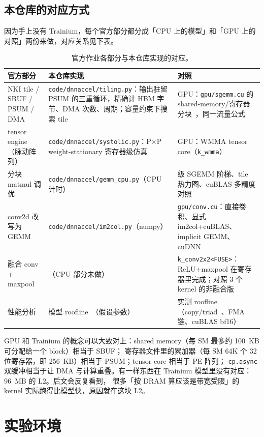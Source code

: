 \documentclass[11pt,a4paper]{ctexart}
\begin{document}
\subsection{本仓库的对应方式}
因为手上没有 Trainium，每个官方部分都分成「CPU 上的模型」和「GPU 上的对照」两份来做，对应关系见下表。
\begin{table}[H]
\centering\small
\begin{tabularx}{\linewidth}{>{\raggedright}p{3.4cm}X>{\raggedright\arraybackslash}p{3.6cm}}
\toprule
官方部分 & 本仓库实现 & 对照 \\
\midrule
NKI tile / SBUF / PSUM / DMA & \texttt{code/dnnaccel/tiling.py}：输出驻留 PSUM 的三重循环，精确计 HBM 字节、DMA 次数、周期；容量约束下搜索 tile & GPU：\texttt{gpu/sgemm.cu} 的 shared-memory/寄存器分块~\cite{goto2008}，同一流量公式 \\
tensor engine（脉动阵列） & \texttt{code/dnnaccel/systolic.py}：P$\times$P weight-stationary 寄存器级仿真 & GPU：WMMA tensor core（\texttt{k\_wmma}） \\
分块 matmul 调优 & \texttt{code/dnnaccel/gemm\_cpu.py}（CPU 计时） & 11 级 SGEMM 阶梯、tile 热力图、cuBLAS 多精度对照 \\
conv2d 改写为 GEMM & \texttt{code/dnnaccel/im2col.py}（numpy） & \texttt{gpu/conv.cu}：直接卷积、显式 im2col+cuBLAS、implicit GEMM、cuDNN~\cite{chetlur2014} \\
融合 conv + maxpool & （CPU 部分未做） & \texttt{k\_conv2x2<FUSE>}：ReLU+maxpool 在寄存器里完成；对照 3 个 kernel 的非融合版 \\
性能分析 & 模型 roofline~\cite{williams2009}（假设参数） & 实测 roofline（copy/triad~\cite{mccalpin1995}、FMA 链、cuBLAS bf16） \\
\bottomrule
\end{tabularx}
\caption{官方作业各部分与本仓库实现的对应。}
\end{table}

GPU 和 Trainium 的概念可以大致对上：shared memory（每 SM 最多约 100~KB 可分配给一个 block）相当于 SBUF；
寄存器文件里的累加器（每 SM 64K 个 32 位寄存器，即 256~KB）相当于 PSUM；tensor core 相当于 PE 阵列；
\texttt{cp.async} 双缓冲相当于让 DMA 与计算重叠。有一样东西在 Trainium 模型里没有对应：96~MB 的 L2。后文会反复看到，
很多「按 DRAM 算应该是带宽受限」的 kernel 实际跑得比模型快，原因就在这块 L2。

\section{实验环境}
\end{document}
